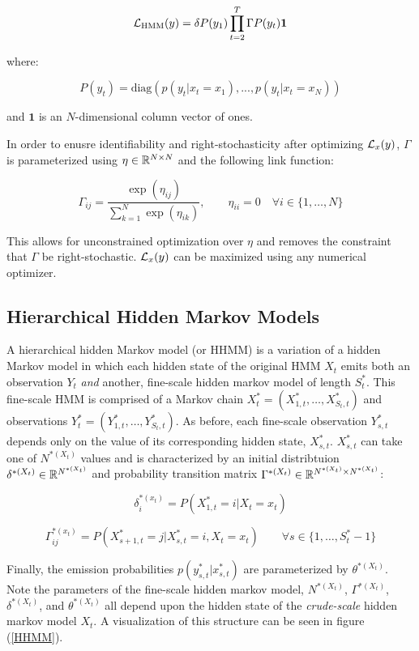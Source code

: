 $$\mathcal{L}_{\text{HMM}}(y) = \delta P(y_1) \prod_{t=2}^T \Gamma P(y_t) \mathbf{1}$$

where:

$$P(y_t) = \text{diag}(p(y_t|x_t = x_1), . . . , p(y_t|x_t = x_N ))$$

and $\mathbf{1}$ is an $N$-dimensional column vector of ones.

In order to enusre identifiability and right-stochasticity after optimizing $\mathcal{L}_x(y)$, $\Gamma$ is parameterized using $\eta \in \mathbb{R}^{N \times N}$ and the following link function:

$$\Gamma_{ij} = \frac{\exp(\eta_{ij})}{\sum_{k=1}^N \exp(\eta_{ik})}, \qquad \eta_{ii} = 0 \quad \forall i \in \{1, \ldots, N\}$$

This allows for unconstrained optimization over $\eta$ and removes the constraint that $\Gamma$ be right-stochastic. $\mathcal{L}_x(y)$ can be maximized using any numerical optimizer.

\subsection{Hierarchical Hidden Markov Models}

A hierarchical hidden Markov model (or HHMM) is a variation of a hidden Markov model in which each hidden state of the original HMM $X_t$ emits both an observation $Y_t$ \textit{and} another, fine-scale hidden markov model of length $S^*_t$. This fine-scale HMM is comprised of a Markov chain $X^*_t = (X^*_{1,t}, \ldots, X^*_{S_t,t})$ and observations $Y^*_t = (Y^*_{1,t}, \ldots, Y^*_{S_t,t})$. As before, each fine-scale observation $Y^*_{s,t}$ depends only on the value of its corresponding hidden state, $X^*_{s,t}$. $X^*_{s,t}$ can take one of $N^{*(X_t)}$ values and is characterized by an initial distribtuion $\delta^{*(X_t)} \in \mathbb{R}^{N^{*(X_t)}}$ and probability transition matrix $\Gamma^{*(X_t)} \in \mathbb{R}^ {N^{*(X_t)} \times N^{*(X_t)}}$:

$$\delta^{*(x_t)}_i = P(X^*_{1,t} = i | X_t = x_t)$$

$$\Gamma^{*(x_t)}_{ij} = P(X^*_{s+1,t} = j | X^*_{s,t} = i, X_t = x_t) \qquad \forall s \in \{ 1, \ldots, S^*_t-1\}$$

Finally, the emission probabilities $p(y^*_{s,t} | x^*_{s,t})$ are parameterized by $\theta^{*(X_t)}$. Note the parameters of the fine-scale hidden markov model, $N^{*(X_t)}$, $\Gamma^{*(X_t)}$, $\delta^{*(X_t)}$, and $\theta^{*(X_t)}$ all depend upon the hidden state of the \textit{crude-scale} hidden markov model $X_t$. A visualization of this  structure can be seen in figure (\ref{HHMM}).

